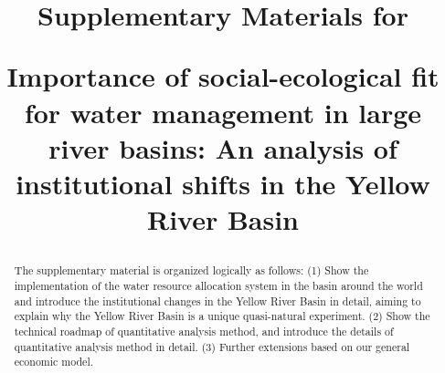 \documentclass{article}
\title{Supplementary Materials for

Importance of social-ecological fit for water management in large river basins: An analysis of institutional shifts in the Yellow River Basin}
\begin{document}
\maketitle


\begin{abstract}
    The supplementary material is organized logically as follows:
    (1) Show the implementation of the water resource allocation system in the basin around the world and introduce the institutional changes in the Yellow River Basin in detail, aiming to explain why the Yellow River Basin is a unique quasi-natural experiment.
    (2) Show the technical roadmap of quantitative analysis method, and introduce the details of quantitative analysis method in detail.
    (3) Further extensions based on our general economic model.
\end{abstract}
\end{document}
